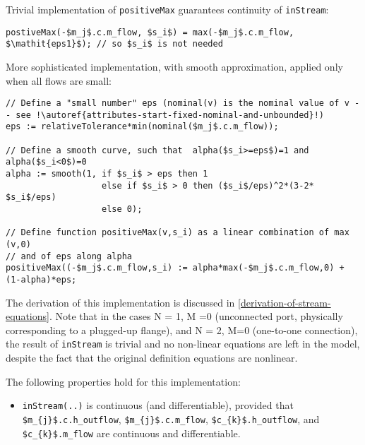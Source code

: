 \begin{nonnormative}
Trivial implementation of \lstinline!positiveMax! guarantees continuity of \lstinline!inStream!:
\begin{lstlisting}[language=modelica,mathescape=true]
postiveMax(-$m_j$.c.m_flow, $s_i$) = max(-$m_j$.c.m_flow, $\mathit{eps1}$); // so $s_i$ is not needed
\end{lstlisting}
More sophisticated implementation, with smooth approximation, applied only when {all} flows are small:
\begin{lstlisting}[language=modelica,escapechar=!,mathescape=true]
// Define a "small number" eps (nominal(v) is the nominal value of v -- see !\autoref{attributes-start-fixed-nominal-and-unbounded}!)
eps := relativeTolerance*min(nominal($m_j$.c.m_flow));

// Define a smooth curve, such that  alpha($s_i>=eps$)=1 and alpha($s_i<0$)=0
alpha := smooth(1, if $s_i$ > eps then 1
                   else if $s_i$ > 0 then ($s_i$/eps)^2*(3-2* $s_i$/eps)
                   else 0);

// Define function positiveMax(v,s_i) as a linear combination of max (v,0)
// and of eps along alpha
positiveMax((-$m_j$.c.m_flow,s_i) := alpha*max(-$m_j$.c.m_flow,0) + (1-alpha)*eps;
\end{lstlisting}

The derivation of this implementation is discussed in
\autoref{derivation-of-stream-equations}. Note that in the cases N = 1, M =0 (unconnected port,
physically corresponding to a plugged-up flange), and N = 2, M=0
(one-to-one connection), the result of \lstinline!inStream! is trivial
and no non-linear equations are left in the model, despite the fact that
the original definition equations are nonlinear.

The following properties hold for this implementation:
\begin{itemize}
\item
  \lstinline!inStream(..)! is continuous (and differentiable),
  provided that \lstinline[mathescape=true]!$m_{j}$.c.h_outflow!,
  \lstinline[mathescape=true]!$m_{j}$.c.m_flow!, \lstinline[mathescape=true]!$c_{k}$.h_outflow!, and
  \lstinline[mathescape=true]!$c_{k}$.m_flow! are continuous and differentiable.
\end{itemize}


\end{nonnormative}
